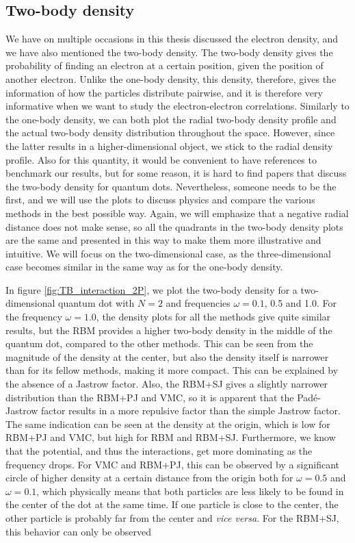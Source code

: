\subsection{Two-body density}
We have on multiple occasions in this thesis discussed the electron density, and we have also mentioned the two-body density. The two-body density gives the probability of finding an electron at a certain position, given the position of another electron. Unlike the one-body density, this density, therefore, gives the information of how the particles distribute pairwise, and it is therefore very informative when we want to study the electron-electron correlations. Similarly to the one-body density, we can both plot the radial two-body density profile and the actual two-body density distribution throughout the space. However, since the latter results in a higher-dimensional object, we stick to the radial density profile. Also for this quantity, it would be convenient to have references to benchmark our results, but for some reason, it is hard to find papers that discuss the two-body density for quantum dots. Nevertheless, someone needs to be the first, and we will use the plots to discuss physics and compare the various methods in the best possible way. Again, we will emphasize that a negative radial distance does not make sense, so all the quadrants in the two-body density plots are the same and presented in this way to make them more illustrative and intuitive. We will focus on the two-dimensional case, as the three-dimensional case becomes similar in the same way as for the one-body density. 

In figure \eqref{fig:TB_interaction_2P}, we plot the two-body density for a two-dimensional quantum dot with $N=2$ and frequencies $\omega=0.1$, 0.5 and 1.0. For the frequency $\omega=1.0$, the density plots for all the methods give quite similar results, but the RBM provides a higher two-body density in the middle of the quantum dot, compared to the other methods. This can be seen from the magnitude of the density at the center, but also the density itself is narrower than for its fellow methods, making it more compact. This can be explained by the absence of a Jastrow factor. Also, the RBM+SJ gives a slightly narrower distribution than the RBM+PJ and VMC, so it is apparent that the Padé-Jastrow factor results in a more repulsive factor than the simple Jastrow factor. The same indication can be seen at the density at the origin, which is low for RBM+PJ and VMC, but high for RBM and RBM+SJ. Furthermore, we know that the potential, and thus the interactions, get more dominating as the frequency drops. For VMC and RBM+PJ, this can be observed by a significant circle of higher density at a certain distance from the origin both for $\omega=0.5$ and $\omega=0.1$, which physically means that both particles are less likely to be found in the center of the dot at the same time. If one particle is close to the center, the other particle is probably far from the center and \textit{vice versa}. For the RBM+SJ, this behavior can only be observed 

